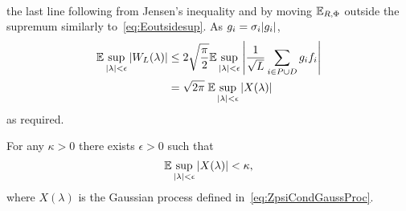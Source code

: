 \documentclass[journal]{IEEEtran}
\begin{document}
\begin{IEEEproof}
\begin{align*}
\end{align*}
the last line following from Jensen's inequality and by moving ${\mathbb E}_{R,\Phi}$ outside the supremum similarly to~\eqref{eq:Eoutsidesup}. As $g_i = \sigma_i {\left\vert g_i \right\vert}$,
\begin{align*}
{\mathbb E} \sup_{{\vert \lambda \vert} < \epsilon} {\left\vert W_L(\lambda) \right\vert}  &\leq 2\sqrt{\frac{\pi}{2}} {\mathbb E} \sup_{{\vert \lambda \vert} < \epsilon}  {\left\vert  \frac{1}{\sqrt{L}}\sum_{i\in P \cup D} g_i  f_{i} \right\vert} \\
&= \sqrt{2\pi} \; {\mathbb E} \sup_{{\vert \lambda \vert} < \epsilon}  {\left\vert  X(\lambda)  \right\vert} 
\end{align*}
as required.
\end{IEEEproof}

\begin{lemma} \label{lem:chaining}
For any $\kappa > 0$ there exists $\epsilon > 0$ such that
\[
{\mathbb E} \sup_{{\vert \lambda \vert} < \epsilon} {\left\vert  X(\lambda)  \right\vert} < \kappa,
\]
where $X(\lambda)$ is the Gaussian process defined in~\eqref{eq:ZpsiCondGaussProc}.
\end{lemma}
\end{document}
